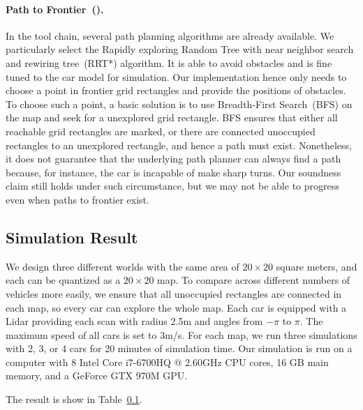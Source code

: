 \paragraph{Path to Frontier~(\PathToFrontier).}
In the \CyPhyHouse tool chain, several path planning algorithms are already available.
We particularly select the Rapidly exploring Random Tree with near neighbor search and rewiring tree~(RRT*) algorithm.
It is able to avoid obstacles and is fine tuned to the car model for simulation.
Our \PathToFrontier implementation hence only needs to choose a point in frontier grid rectangles and provide the positions of obstacles.
To choose such a point, a basic solution is to use Breadth-First Search~(BFS) on the map and seek for a unexplored grid rectangle.
BFS ensures that either all reachable grid rectangles are marked,
or there are connected unoccupied rectangles to an unexplored rectangle, and hence a path must exist.
Nonetheless, it does not guarantee that the underlying path planner can always find a path because,
for instance, the car is incapable of make sharp turns.
Our soundness claim still holds under such circumstance, but we may not be able to progress even when paths to frontier exist.


\subsection{Simulation Result}

We design three different worlds with the same area of $20\times20$ square meters,
and each can be quantized as a $20 \times 20$ map.
To compare across different numbers of vehicles more easily,
we ensure that all unoccupied rectangles are connected in each map,
so every car can explore the whole map.
Each car is equipped with a Lidar providing each scan with radius 2.5m and angles from $-\pi$ to $\pi$.
The maximum speed of all cars is set to 3m/s.
For each map, we run three simulations with 2, 3, or 4 cars for 20 minutes of simulation time.
Our simulation is run on a computer with 8 Intel Core i7-6700HQ @ 2.60GHz CPU cores, 16 GB main memory, and a GeForce GTX 970M GPU.

The result is show in Table~\ref{}.
